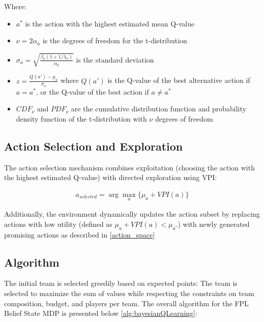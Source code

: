 Where:
\begin{itemize}
    \item $a^*$ is the action with the highest estimated mean Q-value
    \item $\nu = 2\alpha_a$ is the degrees of freedom for the t-distribution
    \item $\sigma_a = \sqrt{\frac{\beta_a(1+1/\lambda_a)}{\alpha_a}}$ is the standard deviation
    \item $z = \frac{Q(a') - \mu_a}{\sigma_a}$ where $Q(a')$ is the Q-value of the best alternative action if $a = a^*$, or the Q-value of the best action if $a \neq a^*$
    \item $CDF_{\nu}$ and $PDF_{\nu}$ are the cumulative distribution function and probability density function of the t-distribution with $\nu$ degrees of freedom
\end{itemize}

\subsection{Action Selection and Exploration}

The action selection mechanism combines exploitation (choosing the action with the highest estimated Q-value) with directed exploration using VPI:

\begin{align}
a_{selected} = \arg\max_a \{\mu_a + VPI(a)\}
\end{align}

Additionally, the environment dynamically updates the action subset by replacing actions with low utility (defined as $\mu_a + VPI(a) < \mu_{a^*}$) with newly generated promising actions as described in \ref{action_space}

\subsection{Algorithm}
The initial team is selected greedily based on expected points:
The team is selected to maximize the sum of values while respecting the constraints on team composition, budget, and players per team.
The overall algorithm for the FPL Belief State MDP is presented below \ref{alg:bayesianQLearning}:

